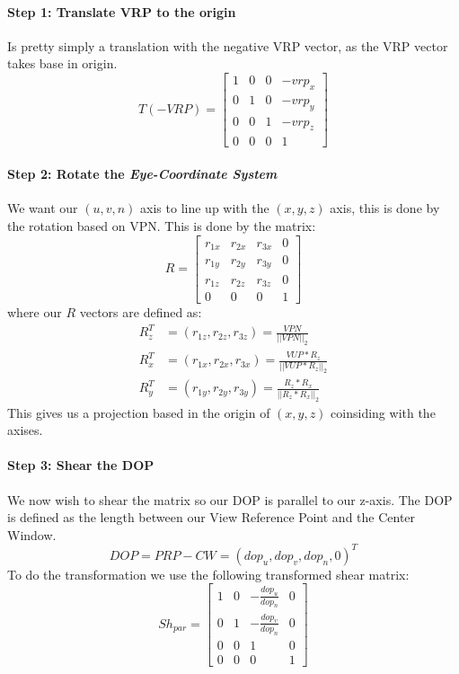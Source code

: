 \documentclass{article}
\begin{document}
\paragraph{Step 1: Translate VRP to the origin}
Is pretty simply a translation with the negative VRP vector, as the 
VRP vector takes base in origin.
\begin{equation*}
    T(-VRP) =
    \begin{bmatrix}
        1 & 0 & 0 & -vrp_x\\
        0 & 1 & 0 & -vrp_{y}\\
        0 & 0 & 1 & -vrp_{z}\\
        0 & 0 & 0 & 1
    \end{bmatrix}
\end{equation*}
\paragraph{Step 2: Rotate the \emph{Eye-Coordinate System}}
We want our $(u,v,n)$ axis to line up with the $(x,y,z)$ axis,
this is done by the rotation based on VPN. This is done by the 
matrix: 
\begin{equation*}
    R =
    \begin{bmatrix}
        r_{1x} & r_{2x} & r_{3x} & 0\\ 
        r_{1y} & r_{2y} & r_{3y} & 0\\
        r_{1z} & r_{2z} & r_{3z} & 0\\
        0 & 0 & 0 & 1
    \end{bmatrix}
\end{equation*}
where our $R$ vectors are defined as:
\begin{align*}
    R^{T}_{z} &= (r_{1z}, r_{2z}, r_{3z}) = \frac{VPN}{||{VPN}||_2}\\
    R^{T}_{x} &= (r_{1x}, r_{2x}, r_{3x}) = \frac{VUP * R_z}{||VUP * R_z||_2}\\
    R^{T}_{y} &= (r_{1y}, r_{2y}, r_{3y}) = \frac{R_z * R_x}{||R_z * R_x||_2}
\end{align*}
This gives us a projection based in the origin of $(x,y,z)$ coinsiding
with the axises.

\paragraph{Step 3: Shear the DOP}
We now wish to shear the matrix so our DOP is parallel to our z-axis.
The DOP is defined as the length between our View Reference Point
and the Center Window.
\begin{equation*}
    DOP = PRP - CW = (dop_u, dop_v, dop_n, 0)^T
\end{equation*}
To do the transformation we use the following transformed shear matrix:
\begin{equation*}
    Sh_{par} = 
    \begin{bmatrix}
        1 & 0 & -\frac{dop_u}{dop_n} & 0\\ 
        0 & 1 & -\frac{dop_v}{dop_n} & 0\\
        0 & 0 & 1 & 0\\
        0 & 0 & 0 & 1
    \end{bmatrix}
\end{equation*}
\end{document}
